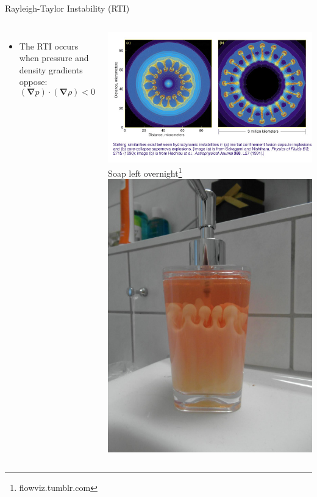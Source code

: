 \documentclass[12pt]{beamer}
\begin{document}
\begin{frame}{Rayleigh-Taylor Instability (RTI)}
\begin{columns}
\begin{itemize}
\item[] The RTI occurs when pressure and density gradients oppose:
$$ (\mathbf{\nabla} p) \cdot (\mathbf{\nabla} \rho) < 0 $$
\end{itemize}
\includegraphics[width=\columnwidth]{graphics/icf}
Soap left overnight\footnote{flowviz.tumblr.com}
\includegraphics[width=\columnwidth]{graphics/soap}
\end{columns}
\end{frame}
\end{document}
